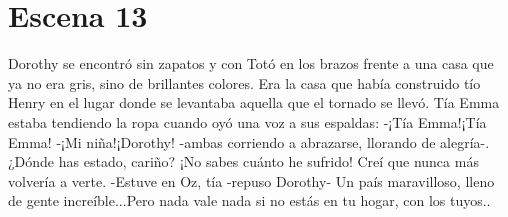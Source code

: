 \chapter{Escena 13}
Dorothy se encontró sin zapatos y con Totó en los brazos frente a una casa que ya no era gris, sino de brillantes colores. Era la casa que había construido tío Henry en el lugar donde se levantaba aquella que el tornado se llevó. Tía Emma estaba tendiendo la ropa cuando oyó una voz a sus espaldas:
-¡Tía Emma!¡Tía Emma!
-¡Mi niña!¡Dorothy! -ambas corriendo a abrazarse, llorando de alegría-. ¿Dónde has estado, cariño? ¡No sabes cuánto he sufrido! Creí que nunca más volvería a verte.
-Estuve en Oz, tía -repuso Dorothy- Un país maravilloso, lleno de gente increíble...Pero nada vale nada si no estás en tu hogar, con los tuyos..

